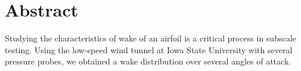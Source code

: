 \thispagestyle{plain} %



\chapter*{Abstract} %
Studying the characteristics of wake of an airfoil is a critical process in subscale testing. Using the low-speed wind tunnel at Iowa State University  with several pressure probes, we obtained a wake distribution over several angles of attack. 



